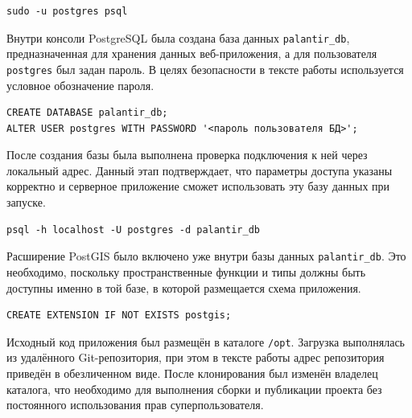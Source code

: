 \begin{code}
\vspace{-0.75cm}
\begin{verbatim}
sudo -u postgres psql
\end{verbatim}
\end{code}

Внутри консоли PostgreSQL была создана база данных \texttt{palantir\_db}, предназначенная для хранения данных веб-приложения, а для пользователя \texttt{postgres} был задан пароль. В целях безопасности в тексте работы используется условное обозначение пароля.

\begin{code}
\vspace{-0.75cm}
\begin{verbatim}
CREATE DATABASE palantir_db;
ALTER USER postgres WITH PASSWORD '<пароль пользователя БД>';
\end{verbatim}
\end{code}

После создания базы была выполнена проверка подключения к ней через локальный адрес. Данный этап подтверждает, что параметры доступа указаны корректно и серверное приложение сможет использовать эту базу данных при запуске.

\begin{code}
\vspace{-0.75cm}
\begin{verbatim}
psql -h localhost -U postgres -d palantir_db
\end{verbatim}
\end{code}

Расширение PostGIS было включено уже внутри базы данных \texttt{palantir\_db}. Это необходимо, поскольку пространственные функции и типы должны быть доступны именно в той базе, в которой размещается схема приложения.

\begin{code}
\vspace{-0.75cm}
\begin{verbatim}
CREATE EXTENSION IF NOT EXISTS postgis;
\end{verbatim}
\end{code}

Исходный код приложения был размещён в каталоге \texttt{/opt}. Загрузка выполнялась из удалённого Git-репозитория, при этом в тексте работы адрес репозитория приведён в обезличенном виде. После клонирования был изменён владелец каталога, что необходимо для выполнения сборки и публикации проекта без постоянного использования прав суперпользователя.

